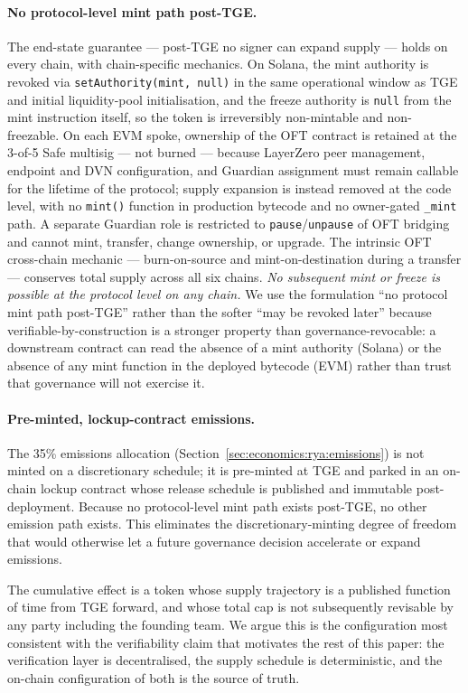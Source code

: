 \documentclass[11pt,a4paper]{article}
\begin{document}
\paragraph{No protocol-level mint path post-TGE.} The end-state guarantee --- post-TGE
no signer can expand supply --- holds on every chain, with chain-specific mechanics.
On Solana, the mint authority is revoked via \texttt{setAuthority(mint, null)} in the
same operational window as TGE and initial liquidity-pool initialisation, and the
freeze authority is \texttt{null} from the mint instruction itself, so the token is
irreversibly non-mintable and non-freezable. On each EVM spoke, ownership of the OFT
contract is retained at the 3-of-5 Safe multisig --- not burned --- because LayerZero
peer management, endpoint and DVN configuration, and Guardian assignment must remain
callable for the lifetime of the protocol; supply expansion is instead removed at
the code level, with no \texttt{mint()} function in production bytecode and no
owner-gated \texttt{\_mint} path. A separate Guardian role is restricted to
\texttt{pause}/\texttt{unpause} of OFT bridging and cannot mint, transfer, change
ownership, or upgrade. The intrinsic OFT cross-chain mechanic --- burn-on-source and
mint-on-destination during a transfer --- conserves total supply across all six
chains. \emph{No subsequent mint or freeze is possible at the protocol level on any
chain.} We use the formulation ``no protocol mint path post-TGE'' rather than the
softer ``may be revoked later'' because verifiable-by-construction is a stronger
property than governance-revocable: a downstream contract can read the absence of a
mint authority (Solana) or the absence of any mint function in the deployed
bytecode (EVM) rather than trust that governance will not exercise it.

\paragraph{Pre-minted, lockup-contract emissions.} The 35\% emissions allocation
(Section~\ref{sec:economics:rya:emissions}) is not minted on a discretionary
schedule; it is pre-minted at TGE and parked in an on-chain lockup contract whose
release schedule is published and immutable post-deployment. Because no
protocol-level mint path exists post-TGE, no other emission path exists. This eliminates the
discretionary-minting degree of freedom that would otherwise let a future governance
decision accelerate or expand emissions.

The cumulative effect is a token whose supply trajectory is a published function of
time from TGE forward, and whose total cap is not subsequently revisable by any
party including the founding team. We argue this is the configuration most
consistent with the verifiability claim that motivates the rest of this paper: the
verification layer is decentralised, the supply schedule is deterministic, and the
on-chain configuration of both is the source of truth.
\end{document}
